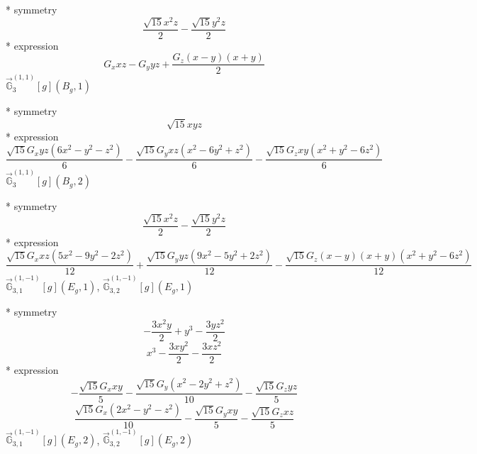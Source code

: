\documentclass[fleqn,8pt]{jsarticle}
\begin{document}
\noindent\quad ** symmetry
\begin{dmath*}
\frac{\sqrt{15} x^{2} z}{2} - \frac{\sqrt{15} y^{2} z}{2}
\end{dmath*}
\noindent\quad ** expression
\begin{dmath*}
G_{x} x z - G_{y} y z + \frac{G_{z} \left(x - y\right) \left(x + y\right)}{2}
\end{dmath*}
\noindent\quad $\vec{\mathbb{G}}_{3}^{(1,1)}[g](B_{g},1)$

\noindent\quad ** symmetry
\begin{dmath*}
\sqrt{15} x y z
\end{dmath*}
\noindent\quad ** expression
\begin{dmath*}
\frac{\sqrt{15} G_{x} y z \left(6 x^{2} - y^{2} - z^{2}\right)}{6} - \frac{\sqrt{15} G_{y} x z \left(x^{2} - 6 y^{2} + z^{2}\right)}{6} - \frac{\sqrt{15} G_{z} x y \left(x^{2} + y^{2} - 6 z^{2}\right)}{6}
\end{dmath*}
\noindent\quad $\vec{\mathbb{G}}_{3}^{(1,1)}[g](B_{g},2)$

\noindent\quad ** symmetry
\begin{dmath*}
\frac{\sqrt{15} x^{2} z}{2} - \frac{\sqrt{15} y^{2} z}{2}
\end{dmath*}
\noindent\quad ** expression
\begin{dmath*}
\frac{\sqrt{15} G_{x} x z \left(5 x^{2} - 9 y^{2} - 2 z^{2}\right)}{12} + \frac{\sqrt{15} G_{y} y z \left(9 x^{2} - 5 y^{2} + 2 z^{2}\right)}{12} - \frac{\sqrt{15} G_{z} \left(x - y\right) \left(x + y\right) \left(x^{2} + y^{2} - 6 z^{2}\right)}{12}
\end{dmath*}
\noindent\quad $\vec{\mathbb{G}}_{3,1}^{(1,-1)}[g](E_{g},1)$, $\vec{\mathbb{G}}_{3,2}^{(1,-1)}[g](E_{g},1)$

\noindent\quad ** symmetry
\begin{dmath*}
- \frac{3 x^{2} y}{2} + y^{3} - \frac{3 y z^{2}}{2}
\end{dmath*}
\begin{dmath*}
x^{3} - \frac{3 x y^{2}}{2} - \frac{3 x z^{2}}{2}
\end{dmath*}
\noindent\quad ** expression
\begin{dmath*}
- \frac{\sqrt{15} G_{x} x y}{5} - \frac{\sqrt{15} G_{y} \left(x^{2} - 2 y^{2} + z^{2}\right)}{10} - \frac{\sqrt{15} G_{z} y z}{5}
\end{dmath*}
\begin{dmath*}
\frac{\sqrt{15} G_{x} \left(2 x^{2} - y^{2} - z^{2}\right)}{10} - \frac{\sqrt{15} G_{y} x y}{5} - \frac{\sqrt{15} G_{z} x z}{5}
\end{dmath*}
\noindent\quad $\vec{\mathbb{G}}_{3,1}^{(1,-1)}[g](E_{g},2)$, $\vec{\mathbb{G}}_{3,2}^{(1,-1)}[g](E_{g},2)$
\end{document}
